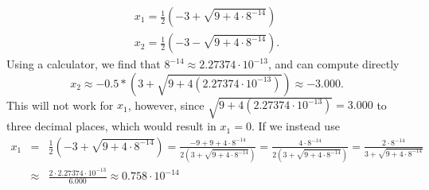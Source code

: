 \documentclass[pdftex,11pt]{article}
\begin{document}
        \begin{eqnarray*}
            x_{1} = \frac{1}{2}(-3 + \sqrt{9 + 4 \cdot 8^{-14}}) \\
            x_{2} = \frac{1}{2}(-3 - \sqrt{9 + 4 \cdot 8^{-14}}).
        \end{eqnarray*}
        Using a calculator, we find that $8^{-14} \approx 2.27374 \cdot 10^{-13}$, and can compute directly
        \[x_{2}  \approx -0.5*(3+\sqrt{9+4(2.27374 \cdot 10^{-13})}) \approx -3.000. \]
        This will not work for $x_{1}$, however, since $\sqrt{9+4(2.27374 \cdot 10^{-13})} = 3.000$ to three
        decimal places, which would result in $x_{1}=0$.  If we instead use 
        \begin{eqnarray*} 
            x_{1} &=& \frac{1}{2}(-3 + \sqrt{9 + 4 \cdot 8^{-14}}) = \frac{-9 + 9 + 4 \cdot 8^{-14}}{2(3 + \sqrt{9 + 4 \cdot 8^{-14}})} = \frac{4 \cdot 8^{-14}}{2(3 + \sqrt{9 + 4 \cdot 8^{-14}})}= \frac{2 \cdot 8^{-14}}{3 + \sqrt{9 + 4 \cdot 8^{-14}}} \\
            &\approx& \frac{2 \cdot 2.27374 \cdot 10^{-13}}{6.000} \approx 0.758 \cdot 10^{-14}
        \end{eqnarray*}      
\end{document}

